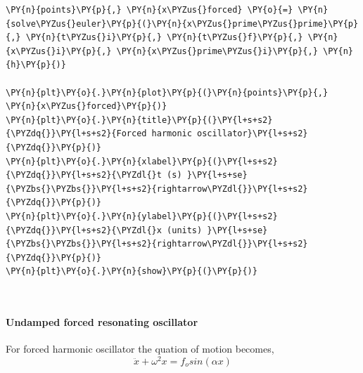    \begin{tcolorbox}[breakable, size=fbox, boxrule=1pt, pad at break*=1mm,colback=cellbackground, colframe=cellborder]
\begin{Verbatim}[commandchars=\\\{\}]
\PY{n}{points}\PY{p}{,} \PY{n}{x\PYZus{}forced} \PY{o}{=} \PY{n}{solve\PYZus{}euler}\PY{p}{(}\PY{n}{x\PYZus{}prime\PYZus{}prime}\PY{p}{,} \PY{n}{t\PYZus{}i}\PY{p}{,} \PY{n}{t\PYZus{}f}\PY{p}{,} \PY{n}{x\PYZus{}i}\PY{p}{,} \PY{n}{x\PYZus{}prime\PYZus{}i}\PY{p}{,} \PY{n}{h}\PY{p}{)}

\PY{n}{plt}\PY{o}{.}\PY{n}{plot}\PY{p}{(}\PY{n}{points}\PY{p}{,} \PY{n}{x\PYZus{}forced}\PY{p}{)}
\PY{n}{plt}\PY{o}{.}\PY{n}{title}\PY{p}{(}\PY{l+s+s2}{\PYZdq{}}\PY{l+s+s2}{Forced harmonic oscillator}\PY{l+s+s2}{\PYZdq{}}\PY{p}{)}
\PY{n}{plt}\PY{o}{.}\PY{n}{xlabel}\PY{p}{(}\PY{l+s+s2}{\PYZdq{}}\PY{l+s+s2}{\PYZdl{}t (s) }\PY{l+s+se}{\PYZbs{}\PYZbs{}}\PY{l+s+s2}{rightarrow\PYZdl{}}\PY{l+s+s2}{\PYZdq{}}\PY{p}{)}
\PY{n}{plt}\PY{o}{.}\PY{n}{ylabel}\PY{p}{(}\PY{l+s+s2}{\PYZdq{}}\PY{l+s+s2}{\PYZdl{}x (units) }\PY{l+s+se}{\PYZbs{}\PYZbs{}}\PY{l+s+s2}{rightarrow\PYZdl{}}\PY{l+s+s2}{\PYZdq{}}\PY{p}{)}
\PY{n}{plt}\PY{o}{.}\PY{n}{show}\PY{p}{(}\PY{p}{)}
\end{Verbatim}
\end{tcolorbox}

    \begin{center}
    \end{center}
    { \hspace*{\fill} \\}
    
    \hypertarget{undamped-forced-resonating-oscillator}{%
\paragraph{Undamped forced resonating
oscillator}\label{undamped-forced-resonating-oscillator}}

    For forced harmonic oscillator the quation of motion becomes,
\[\ddot x + \omega^2 x = f_o sin(\alpha x)\]

